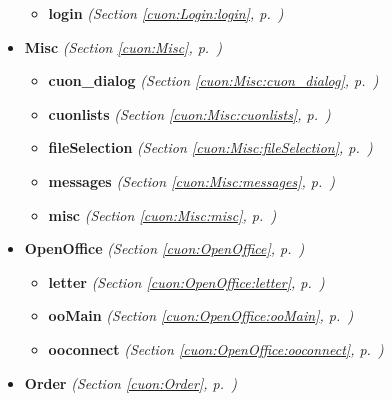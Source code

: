 \begin{itemize}
  \begin{itemize}
\setlength{\parskip}{0ex}
    \item \textbf{login}
  \textit{(Section \ref{cuon:Login:login}, p.~\pageref{cuon:Login:login})}

  \end{itemize}
\item \textbf{Misc}
  \textit{(Section \ref{cuon:Misc}, p.~\pageref{cuon:Misc})}

  \begin{itemize}
\setlength{\parskip}{0ex}
    \item \textbf{cuon\_dialog}
  \textit{(Section \ref{cuon:Misc:cuon_dialog}, p.~\pageref{cuon:Misc:cuon_dialog})}

    \item \textbf{cuonlists}
  \textit{(Section \ref{cuon:Misc:cuonlists}, p.~\pageref{cuon:Misc:cuonlists})}

    \item \textbf{fileSelection}
  \textit{(Section \ref{cuon:Misc:fileSelection}, p.~\pageref{cuon:Misc:fileSelection})}

    \item \textbf{messages}
  \textit{(Section \ref{cuon:Misc:messages}, p.~\pageref{cuon:Misc:messages})}

    \item \textbf{misc}
  \textit{(Section \ref{cuon:Misc:misc}, p.~\pageref{cuon:Misc:misc})}

  \end{itemize}
\item \textbf{OpenOffice}
  \textit{(Section \ref{cuon:OpenOffice}, p.~\pageref{cuon:OpenOffice})}

  \begin{itemize}
\setlength{\parskip}{0ex}
    \item \textbf{letter}
  \textit{(Section \ref{cuon:OpenOffice:letter}, p.~\pageref{cuon:OpenOffice:letter})}

    \item \textbf{ooMain}
  \textit{(Section \ref{cuon:OpenOffice:ooMain}, p.~\pageref{cuon:OpenOffice:ooMain})}

    \item \textbf{ooconnect}
  \textit{(Section \ref{cuon:OpenOffice:ooconnect}, p.~\pageref{cuon:OpenOffice:ooconnect})}

  \end{itemize}
\item \textbf{Order}
  \textit{(Section \ref{cuon:Order}, p.~\pageref{cuon:Order})}


\end{itemize}
